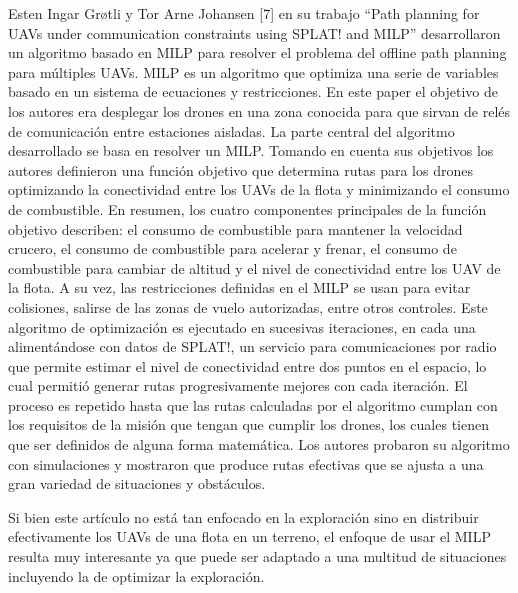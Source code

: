 Esten Ingar Grøtli y Tor Arne Johansen [7] en su trabajo “Path planning for UAVs under communication constraints using SPLAT! and MILP” desarrollaron un algoritmo basado en MILP para resolver el problema del offline path planning para múltiples UAVs. MILP es un algoritmo que optimiza una serie de variables basado en un sistema de ecuaciones y restricciones. En este paper el objetivo de los autores era desplegar los drones en una zona conocida para que sirvan de relés de comunicación entre estaciones aisladas. La parte central del algoritmo desarrollado se basa en resolver un MILP. Tomando en cuenta sus objetivos los autores definieron una función objetivo que determina rutas para los drones optimizando la conectividad entre los UAVs de la flota y minimizando el consumo de combustible. En resumen, los cuatro componentes principales de la función objetivo describen: el consumo de combustible para mantener la velocidad crucero, el consumo de combustible para acelerar y frenar, el consumo de combustible para cambiar de altitud y el nivel de conectividad entre los UAV de la flota. A su vez, las restricciones definidas en el MILP se usan para evitar colisiones, salirse de las zonas de vuelo autorizadas, entre otros controles. Este algoritmo de optimización es ejecutado en sucesivas iteraciones, en cada una alimentándose con datos de SPLAT!, un servicio para comunicaciones por radio que permite estimar el nivel de conectividad entre dos puntos en el espacio, lo cual permitió generar rutas progresivamente mejores con cada iteración. El proceso es repetido hasta que las rutas calculadas por el algoritmo cumplan con los requisitos de la misión que tengan que cumplir los drones, los cuales tienen que ser definidos de alguna forma matemática.
Los autores probaron su algoritmo con simulaciones y mostraron que produce rutas efectivas que se ajusta a una gran variedad de situaciones y obstáculos.

Si bien este artículo no está tan enfocado en la exploración sino en distribuir efectivamente los UAVs de una flota en un terreno, el enfoque de usar el MILP resulta muy interesante ya que puede ser adaptado a una multitud de situaciones incluyendo la de optimizar la exploración.

